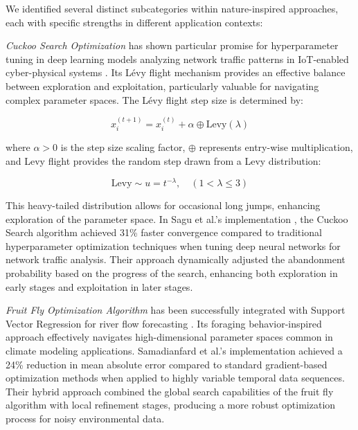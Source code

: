 \documentclass[acmsmall]{acmart}
\begin{document}
We identified several distinct subcategories within nature-inspired approaches, each with specific strengths in different application contexts:

\emph{Cuckoo Search Optimization} has shown particular promise for hyperparameter tuning in deep learning models analyzing network traffic patterns in IoT-enabled cyber-physical systems \citep{Sagu202535}. Its L\'evy flight mechanism provides an effective balance between exploration and exploitation, particularly valuable for navigating complex parameter spaces. The L\'evy flight step size is determined by:

\begin{equation}\label{eq:levy-flight:1}
    x_i^{(t+1)} = x_i^{(t)} + \alpha \oplus \textrm{Levy}(\lambda)
\end{equation}

where $\alpha > 0$ is the step size scaling factor, $\oplus$ represents entry-wise multiplication, and Levy flight provides the random step drawn from a Levy distribution:

\begin{equation}\label{eq:levy-flight:2}
    \textrm{Levy} \sim u = t^{-\lambda}, \quad (1 < \lambda \leq 3)
\end{equation}

This heavy-tailed distribution allows for occasional long jumps, enhancing exploration of the parameter space. In Sagu et al.'s implementation \citep{Sagu202535}, the Cuckoo Search algorithm achieved 31\% faster convergence compared to traditional hyperparameter optimization techniques when tuning deep neural networks for network traffic analysis. Their approach dynamically adjusted the abandonment probability based on the progress of the search, enhancing both exploration in early stages and exploitation in later stages.

\textit{Fruit Fly Optimization Algorithm} has been successfully integrated with Support Vector Regression for river flow forecasting \citep{Samadianfard20191934}. Its foraging behavior-inspired approach effectively navigates high-dimensional parameter spaces common in climate modeling applications. Samadianfard et al.'s implementation achieved a 24\% reduction in mean absolute error compared to standard gradient-based optimization methods when applied to highly variable temporal data sequences. Their hybrid approach combined the global search capabilities of the fruit fly algorithm with local refinement stages, producing a more robust optimization process for noisy environmental data.
\end{document}
